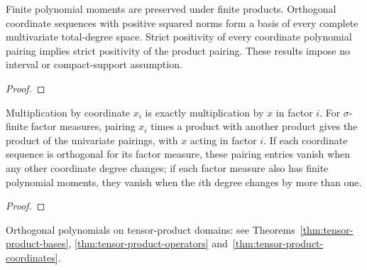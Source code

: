 \begin{supporting}
\begin{theorem}
\label{thm:tensor-product-bases}
\leanok
Finite polynomial moments are preserved under finite products. Orthogonal coordinate sequences with positive squared norms form a basis of every complete multivariate total-degree space. Strict positivity of every coordinate polynomial pairing implies strict positivity of the product pairing. These results impose no interval or compact-support assumption.
\end{theorem}
\begin{proof}
\leanok
\end{proof}
\end{supporting}


\begin{theorem}
\label{thm:tensor-product-operators}
\leanok
Multiplication by coordinate $x_i$ is exactly multiplication by $x$ in factor $i$. For $\sigma$-finite factor measures, pairing $x_i$ times a product with another product gives the product of the univariate pairings, with $x$ acting in factor $i$. If each coordinate sequence is orthogonal for its factor measure, these pairing entries vanish when any other coordinate degree changes; if each factor measure also has finite polynomial moments, they vanish when the $i$th degree changes by more than one.
\end{theorem}
\begin{proof}
\leanok
\end{proof}

Orthogonal polynomials on tensor-product domains: see Theorems~\ref{thm:tensor-product-bases}, \ref{thm:tensor-product-operators} and~\ref{thm:tensor-product-coordinates}.

